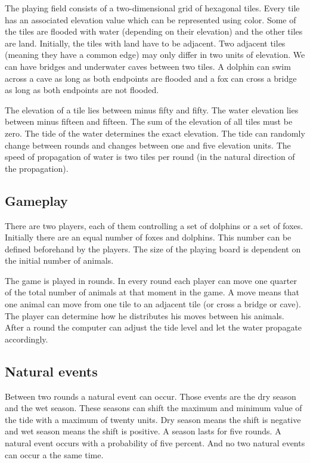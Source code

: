 \documentclass[12pt]{article}
\begin{document}
The playing field consists of a two-dimensional grid of hexagonal tiles. Every tile has an associated elevation value which can be represented using color. Some of the tiles are flooded with water (depending on their elevation) and the other tiles are land. Initially, the tiles with land have to be adjacent. Two adjacent tiles (meaning they have a common edge) may only differ in two units of elevation. We can have bridges and underwater caves between two tiles. A dolphin can swim across a cave as long as both endpoints are flooded and a fox can cross a bridge as long as both endpoints are not flooded.

The elevation of a tile lies between minus fifty and fifty. The water elevation lies between minus fifteen and fifteen. The sum of the elevation of all tiles must be zero. The tide of the water determines the exact elevation. The tide can randomly change between rounds and changes between one and five elevation units. The speed of propagation of water is two tiles per round (in the natural direction of the propagation).

\subsection{Gameplay}
There are two players, each of them controlling a set of dolphins or a set of foxes. Initially there are an equal number of foxes and dolphins. This number can be defined beforehand by the players. The size of the playing board is dependent on the initial number of animals.

The game is played in rounds. In every round each player can move one quarter of the total number of animals at that moment in the game. A move means that one animal can move from one tile to an adjacent tile (or cross a bridge or cave). The player can determine how he distributes his moves between his animals. After a round the computer can adjust the tide level and let the water propagate accordingly.

\subsection{Natural events}
Between two rounds a natural event can occur. Those events are the dry season and the wet season. These seasons can shift the maximum and minimum value of the tide with a maximum of twenty units. Dry season means the shift is negative and wet season means the shift is positive. A season lasts for five rounds. A natural event occurs with a probability of five percent. And no two natural events can occur a the same time.
\end{document}
